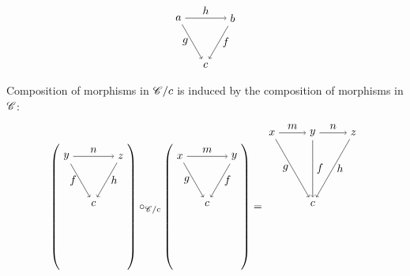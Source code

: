 \documentclass[10pt]{article}
\theoremstyle{definition}
\theoremstyle{remark}
\begin{document}
\[
    \begin{tikzpicture}
        \draw (150:1) node(tl){$a$};
        \draw ( 30:1) node(tr){$b$};
        \draw (270:1)node(bm){$c$};

        \draw[->] (tl) to node[below,left ]{$g$} (bm);
        \draw[->] (tr) to node[below,right]{$f$} (bm);

        \draw[->] (tl) to node[above]{$h$} (tr);
    \end{tikzpicture}
\]
Composition of morphisms in $\mathscr{C}/c$ is induced by the composition of morphisms in $\mathscr{C}$:
\[
    \left(
    \begin{tikzpicture}
        \draw (150:1) node(tl){$y$};
        \draw ( 30:1) node(tr){$z$};
        \draw (270:1) node(bm){$c$};

        \draw[->] (tl) to node[below,left ]{$f$} (bm);
        \draw[->] (tr) to node[below,right]{$h$} (bm);

        \draw[->] (tl) to node[above]{$n$} (tr);
    \end{tikzpicture}
    \right)
    \circ_{\catC/c}
    \left(
    \begin{tikzpicture}
        \draw (150:1) node(tl){$x$};
        \draw ( 30:1) node(tr){$y$};
        \draw (270:1) node(bm){$c$};

        \draw[->] (tl) to node[below,left ]{$g$} (bm);
        \draw[->] (tr) to node[below,right]{$f$} (bm);

        \draw[->] (tl) to node[above]{$m$} (tr);
    \end{tikzpicture}
    \right)
    =
    \begin{tikzpicture}
        \draw (150:1.5) node(tl){$x$};
        \draw ( 90:0.75) node(tm){$y$};
        \draw ( 30:1.5) node(tr){$z$};
        \draw (270:1.5) node(bm){$c$};

        \draw[->] (tl) to node[below,left ]{$g$} (bm);
        \draw[->] (tm) to node[right]{$f$} (bm);
        \draw[->] (tr) to node[below,right]{$h$} (bm);

        \draw[->] (tl) to node[above]{$m$} (tm);
        \draw[->] (tm) to node[above]{$n$} (tr);
    \end{tikzpicture}
\]
\end{document}
